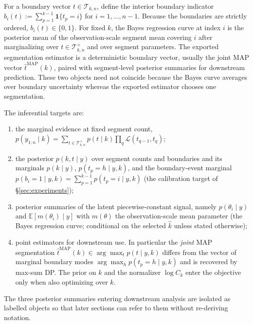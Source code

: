 \begin{definition}
\label{def:problem-bayes-curve}
For a boundary vector $t\in\mathcal{T}_{k,n}$, define the interior boundary indicator
$b_i(t):=\sum_{p=1}^{k-1}\mathbf{1}\{t_p=i\}$ for $i=1,\dots,n-1$. Because the boundaries are
strictly ordered, $b_i(t)\in\{0,1\}$. For fixed $k$, the Bayes regression curve at index $i$ is
the posterior mean of the observation-scale segment mean covering $i$ after marginalizing over
$t\in\mathcal{T}^{+}_{k,n}$ and over segment parameters. The exported segmentation estimator is a
deterministic boundary vector, usually the joint MAP vector $\widehat t^{\mathrm{MAP}}(k)$, paired
with segment-level posterior summaries for downstream prediction. These two objects need not
coincide because the Bayes curve averages over boundary uncertainty whereas the exported estimator
chooses one segmentation.
\end{definition}

The inferential targets are:
\begin{enumerate}[label=(\roman*), leftmargin=2.3em]
    \item the marginal evidence at fixed segment count,
    \(p(y_{1:n}\mid k)=\sum_{t\in\mathcal{T}^{+}_{k,n}}p(t\mid k)\prod_{q}\mathcal{L}(t_{q-1},t_q)\);
    \item the posterior $p(k,t\mid y)$ over segment counts and boundaries and its marginals
    $p(k\mid y)$, $p(t_p=h\mid y,k)$, and the boundary-event marginal
    \(p(b_i=1\mid y,k)=\sum_{p=1}^{k-1}p(t_p=i\mid y,k)\)
    (the calibration target of \S\ref{sec:experiments});
    \item posterior summaries of the latent piecewise-constant signal, namely
    $p(\theta_i\mid y)$ and $\mathbb{E}[m(\theta_i)\mid y]$ with $m(\theta)$ the
    observation-scale mean parameter (the Bayes regression curve; conditional on the selected
    $\widehat k$ unless stated otherwise);
    \item point estimators for downstream use. In particular the \emph{joint} MAP segmentation
    \(\widehat t^{\mathrm{MAP}}(k)\in\arg\max_t p(t\mid y,k)\)
    differs from the vector of marginal boundary modes
    \(\arg\max_h p(t_p=h\mid y,k)\)
    and is recovered by max-sum DP. The prior on $k$ and the normalizer $\log C_k$ enter the
    objective only when also optimizing over $k$.
\end{enumerate}

The three posterior summaries entering downstream analysis are isolated as labelled objects so
that later sections can refer to them without re-deriving notation.

